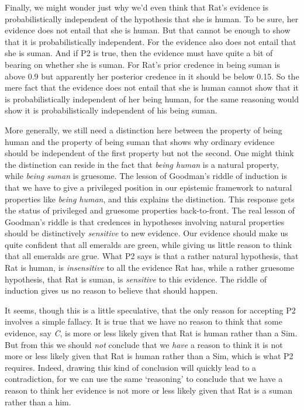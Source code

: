 \documentclass[
  11pt,
  letterpaper,
  DIV=11,
  numbers=noendperiod,
  twoside]{scrartcl}
\begin{document}
Finally, we might wonder just why we'd even think that Rat's evidence is
probabilistically independent of the hypothesis that she is human. To be
sure, her evidence does not entail that she is human. But that cannot be
enough to show that it is probabilistically independent. For the
evidence also does not entail that she is suman. And if P2 is true, then
the evidence must have quite a bit of bearing on whether she is suman.
For Rat's prior credence in being suman is above 0.9 but apparently her
posterior credence in it should be below 0.15. So the mere fact that the
evidence does not entail that she is human cannot show that it is
probabilistically independent of her being human, for the same reasoning
would show it is probabilistically independent of his being suman.

More generally, we still need a distinction here between the property of
being human and the property of being suman that shows why ordinary
evidence should be independent of the first property but not the second.
One might think the distinction can reside in the fact that \emph{being
human} is a natural property, while \emph{being suman} is gruesome. The
lesson of Goodman's riddle of induction is that we have to give a
privileged position in our epistemic framework to natural properties
like \emph{being human}, and this explains the distinction. This
response gets the status of privileged and gruesome properties
back-to-front. The real lesson of Goodman's riddle is that credences in
hypotheses involving natural properties should be distinctively
\emph{sensitive} to new evidence. Our evidence should make us quite
confident that all emeralds are green, while giving us little reason to
think that all emeralds are grue. What P2 says is that a rather natural
hypothesis, that Rat is human, is \emph{insensitive} to all the evidence
Rat has, while a rather gruesome hypothesis, that Rat is suman, is
\emph{sensitive} to this evidence. The riddle of induction gives us no
reason to believe that should happen.

It seems, though this is a little speculative, that the only reason for
accepting P2 involves a simple fallacy. It is true that we have no
reason to think that some evidence, say \emph{C}, is more or less likely
given that Rat is human rather than a Sim. But from this we should
\emph{not} conclude that we \emph{have} a reason to think it is not more
or less likely given that Rat is human rather than a Sim, which is what
P2 requires. Indeed, drawing this kind of conclusion will quickly lead
to a contradiction, for we can use the same `reasoning' to conclude that
we have a reason to think her evidence is not more or less likely given
that Rat is a suman rather than a him.
\end{document}
